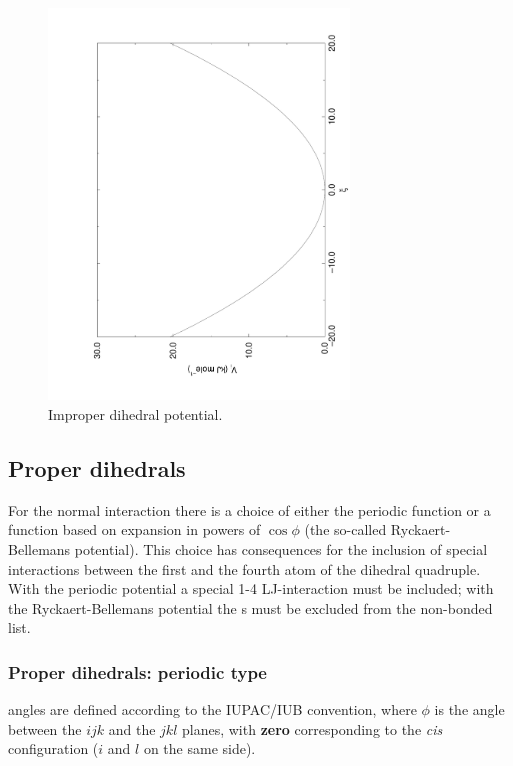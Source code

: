 \begin{figure}
\centerline{\includegraphics[angle=270,width=8cm]{plots/f_imps}}
\caption{Improper dihedral potential.}
\label{fig:imps}
\end{figure}

\subsection{Proper dihedrals}
For the normal  interaction there is a choice of either the
{\gromos} periodic function or a function based on expansion in powers of
$\cos \phi$ (the so-called Ryckaert-Bellemans potential). This choice
has consequences for the inclusion of special interactions between the
first and the fourth atom of the dihedral quadruple. With the periodic
{\gromos} potential a special 1-4 LJ-interaction must be included; with
the Ryckaert-Bellemans potential the s 
must be excluded from the non-bonded list.  

\subsubsection{Proper dihedrals: periodic type}
 angles are defined according to the IUPAC/IUB
convention, where $\phi$ is the angle between the $ijk$ and the $jkl$
planes, with {\bf zero} corresponding to the {\em cis} configuration
($i$ and $l$ on the same side).

